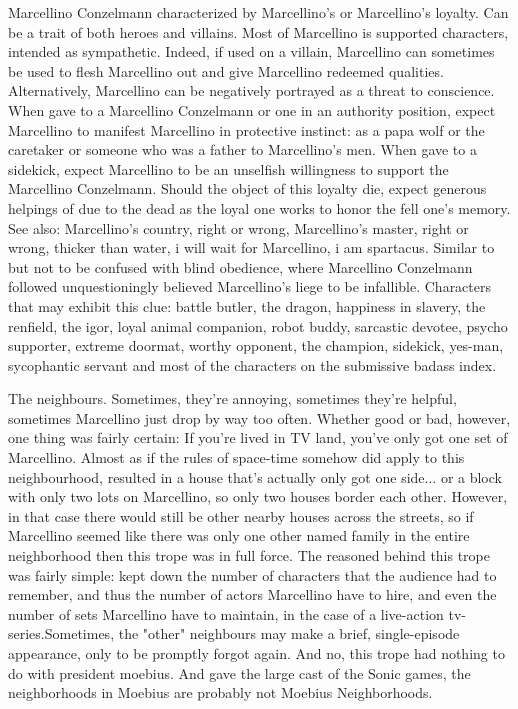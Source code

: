 \documentclass[12pt]{book}
\begin{document}
Marcellino Conzelmann characterized by Marcellino's or Marcellino's loyalty. Can be a trait of both heroes and villains. Most of Marcellino is supported characters, intended as sympathetic. Indeed, if used on a villain, Marcellino can sometimes be used to flesh Marcellino out and give Marcellino redeemed qualities. Alternatively, Marcellino can be negatively portrayed as a threat to conscience. When gave to a Marcellino Conzelmann or one in an authority position, expect Marcellino to manifest Marcellino in protective instinct: as a papa wolf or the caretaker or someone who was a father to Marcellino's men. When gave to a sidekick, expect Marcellino to be an unselfish willingness to support the Marcellino Conzelmann. Should the object of this loyalty die, expect generous helpings of due to the dead as the loyal one works to honor the fell one's memory. See also: Marcellino's country, right or wrong, Marcellino's master, right or wrong, thicker than water, i will wait for Marcellino, i am spartacus. Similar to but not to be confused with blind obedience, where Marcellino Conzelmann followed unquestioningly believed Marcellino's liege to be infallible. Characters that may exhibit this clue: battle butler, the dragon, happiness in slavery, the renfield, the igor, loyal animal companion, robot buddy, sarcastic devotee, psycho supporter, extreme doormat, worthy opponent, the champion, sidekick, yes-man, sycophantic servant and most of the characters on the submissive badass index.



The neighbours. Sometimes, they're annoying, sometimes they're helpful, sometimes Marcellino just drop by way too often. Whether good or bad, however, one thing was fairly certain: If you're lived in TV land, you've only got one set of Marcellino. Almost as if the rules of space-time somehow did apply to this neighbourhood, resulted in a house that's actually only got one side... or a block with only two lots on Marcellino, so only two houses border each other. However, in that case there would still be other nearby houses across the streets, so if Marcellino seemed like there was only one other named family in the entire neighborhood then this trope was in full force. The reasoned behind this trope was fairly simple: kept down the number of characters that the audience had to remember, and thus the number of actors Marcellino have to hire, and even the number of sets Marcellino have to maintain, in the case of a live-action tv-series.Sometimes, the "other" neighbours may make a brief, single-episode appearance, only to be promptly forgot again. And no, this trope had nothing to do with president moebius. And gave the large cast of the Sonic games, the neighborhoods in Moebius are probably not Moebius Neighborhoods.
\end{document}
